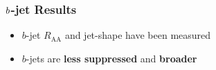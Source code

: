 \begin{frame}
  \frametitle{$\boldmath{b}$\textbf{-jet Results}}

  \begin{itemize}
  \item $b$-jet $R_{\text{AA}}$ and jet-shape have been measured
  \item $b$-jets are \textbf{less suppressed} and \textbf{broader}
  \end{itemize}

  \begin{columns}
  \end{columns}
  
\end{frame}


  



